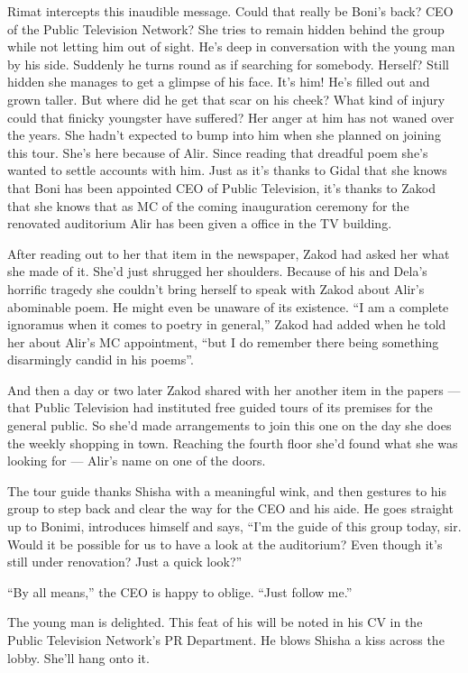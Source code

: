 \documentclass[twoside,11pt,openany]{book}
\begin{document}
Rimat intercepts this inaudible message. Could that really be Boni's back? CEO of the Public Television Network? She
tries to remain hidden behind the group
while not letting him out of sight. He's deep in conversation with the young man by his side.
Suddenly he turns round as if searching for somebody. Herself? Still hidden she manages to get a glimpse of his face.
It's him! He's filled out and grown taller. But where did he get that scar on his cheek? What kind of injury could
that finicky youngster have suffered? Her anger at him has not waned over the years. She hadn't expected to bump into
him when she planned on joining this tour{.} She's here because of
Alir.  Since reading that dreadful poem she's wanted to settle accounts with him. Just as it's thanks to Gidal that
she knows that Boni has been appointed CEO of Public Television, it's thanks to Zakod that she knows that as MC of
the coming inauguration ceremony for the renovated auditorium Alir
has been given a office in the TV building.

After reading out to her that item in the newspaper, Zakod had asked her what she made of it. She'd just shrugged her
shoulders. Because of his and Dela's horrific tragedy she couldn't bring herself to speak with Zakod about Alir's
abominable poem. He might even be unaware of its existence. ``I am a complete ignoramus when it comes to
poetry in general,'' Zakod had added when he told her about Alir's MC appointment, ``but I
do remember there being something disarmingly candid in his poems''.

And then a day or two later Zakod shared with her another item in the papers --- that Public Television had instituted free
guided tours of its premises for the general public. So she'd made arrangements to join this one on the day she does
the weekly shopping in town. Reaching the fourth floor she'd found what she was looking for --- Alir's name on one of the
doors.

The tour guide thanks Shisha with a meaningful wink, and then gestures to his group to step back and clear the way for
the CEO and his aide. He goes straight up to Bonimi, introduces himself and
says, ``I'm the guide of
this group today, sir. Would it be possible for us to have a look at the auditorium? Even though it's still under
renovation? Just a quick look?''

``By all means,'' the CEO is happy to oblige. ``Just follow me.''

The young man is delighted. This feat of his will be noted in his CV in the Public Television Network's PR Department.
He blows Shisha a kiss across the lobby. She'll hang onto it.
\end{document}
